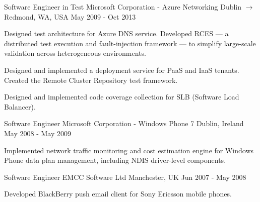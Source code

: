 \newpage
{}
\begin{cventries}

\cventry
{Software Engineer in Test} %
{Microsoft Corporation - Azure Networking} %
{Dublin \(\rightarrow\) Redmond, WA, USA} %
{May 2009 - Oct 2013} %
{
  \begin{cvitems} %
    \item
    {
      Designed test architecture for Azure DNS service.
      Developed RCES --- a distributed test execution and fault-injection framework --- to simplify large-scale validation across heterogeneous environments.
    }
    \item
    {
      Designed and implemented a deployment service for PaaS and IaaS tenants.
      Created the Remote Cluster Repository test framework.
    }
    \item
    {
      Designed and implemented code coverage collection for SLB (Software Load Balancer).
    }
  \end{cvitems}
}
\par\vspace{2mm}

\cventry
{Software Engineer} %
{Microsoft Corporation - Windows Phone 7} %
{Dublin, Ireland} %
{May 2008 - May 2009} %
{
  \begin{cvitems} %
    \item
    {
      Implemented network traffic monitoring and cost estimation engine for Windows Phone data plan management, including NDIS driver-level components.
    }
  \end{cvitems}
}
\par\vspace{2mm}

\cventry
{Software Engineer} %
{EMCC Software Ltd} %
{Manchester, UK} %
{Jun 2007 - May 2008} %
{
  \begin{cvitems} %
    \item
    {
      Developed BlackBerry push email client for Sony Ericsson mobile phones.
    }
  \end{cvitems}
}
\par\vspace{2mm}


\end{cventries}
